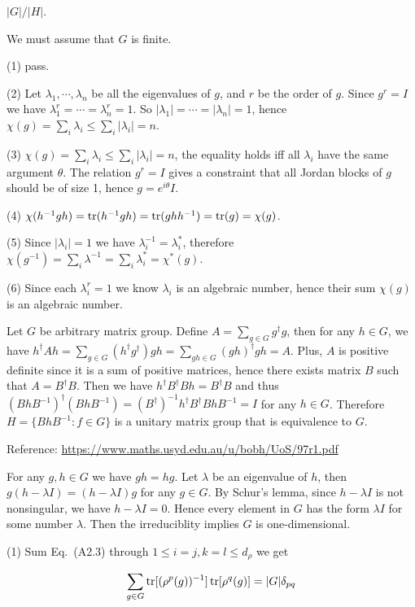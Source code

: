 \ex $|G|/|H|$.

\ex We must assume that $G$ is finite.

(1) pass.

(2) Let $\lambda_1,\cdots,\lambda_n$ be all the eigenvalues of $g$, and $r$ be the order of $g$.
Since $g^r=I$ we have $\lambda_1^r=\cdots=\lambda_n^r=1$.
So $|\lambda_1|=\cdots=|\lambda_n|=1$, hence $\chi(g)=\sum_i\lambda_i \le \sum_i|\lambda_i| = n$.

(3) $\chi(g)=\sum_i\lambda_i \le \sum_i|\lambda_i| = n$, the equality holds iff all $\lambda_i$ have the same argument $\theta$.
The relation $g^r=I$ gives a constraint that all Jordan blocks of $g$ should be of size 1, hence $g=e^{i\theta}I$.

(4) $\chi(h^{-1}gh)=\operatorname{tr}(h^{-1}gh)=\operatorname{tr}(ghh^{-1})=\operatorname{tr}(g)=\chi(g)$.

(5) Since $|\lambda_i|=1$ we have $\lambda_i^{-1}=\lambda_i^*$, therefore $\chi(g^{-1})=\sum_i\lambda^{-1}=\sum_i\lambda_i^*=\chi^*(g)$.

(6) Since each $\lambda_i^r=1$ we know $\lambda_i$ is an algebraic number, hence their sum $\chi(g)$ is an algebraic number.

\ex Let $G$ be arbitrary matrix group.
Define $A=\sum_{g\in G}g^\dagger g$, then for any $h\in G$, we have $h^\dagger Ah=\sum_{g\in G}(h^\dagger g^\dagger)gh=\sum_{gh\in G}(gh)^\dagger gh=A$.
Plus, $A$ is positive definite since it is a sum of positive matrices, hence there exists matrix $B$ such that $A=B^\dagger B$.
Then we have $h^\dagger B^\dagger Bh=B^\dagger B$ and thus $(BhB^{-1})^\dagger(BhB^{-1})=(B^\dagger)^{-1}h^\dagger B^\dagger BhB^{-1}=I$ for any $h\in G$.
Therefore $H=\{BhB^{-1}:f\in G\}$ is a unitary matrix group that is equivalence to $G$.

Reference: \url{https://www.maths.usyd.edu.au/u/bobh/UoS/97r1.pdf}

\ex For any $g,h\in G$ we have $gh=hg$.
Let $\lambda$ be an eigenvalue of $h$, then $g(h-\lambda I)=(h-\lambda I)g$ for any $g\in G$.
By Schur's lemma, since $h-\lambda I$ is not nonsingular, we have $h-\lambda I=0$.
Hence every element in $G$ has the form $\lambda I$ for some number $\lambda$.
Then the irreduciblity implies $G$ is one-dimensional.

\ex {}

\ex (1) Sum Eq.~(A2.3) through $1\le i=j, k=l \le d_\rho$ we get

$$\sum_{g\in G}\operatorname{tr}[(\rho^p(g))^{-1}]\operatorname{tr}[\rho^q(g)] = |G|\delta_{pq}$$

